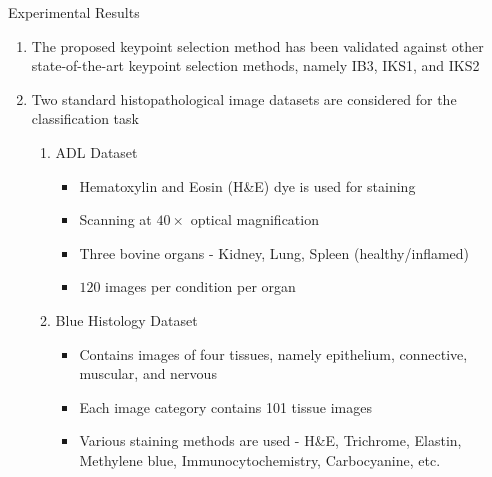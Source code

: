 \documentclass [9pt,times] {beamer}
\begin{document}
\begin{frame}{Experimental Results}
\fontsize{7pt}{9pt}\selectfont
\begin{enumerate}
			\justifying
			\item The proposed keypoint selection method has been validated against 						other state-of-the-art keypoint selection methods, namely IB3, IKS1, and 						IKS2 \cite{lin2016} \\[0.2cm]
			
			\item Two standard \textcolor[rgb]{1.00,0.00,0.00}{histopathological image datasets} are considered for the classification task
			\begin{enumerate}
\fontsize{7pt}{9pt}\selectfont
			\item  \textcolor[rgb]{0.00,0.00,1.00}{ADL Dataset} \cite{srinivas2014}
			\begin{itemize}
\fontsize{7pt}{9pt}\selectfont
				\item Hematoxylin and Eosin (H\&E) dye is used for staining
				\item Scanning at $40\times$ optical magnification   
				\item  Three bovine organs - Kidney, Lung, Spleen   (healthy/inflamed)
				\item $120$ images per condition per organ
			\end{itemize}
			\item \textcolor[rgb]{0.00,0.00,1.00}{Blue Histology Dataset} \cite{sirinukunwattana2016locality}
 			\begin{itemize}
\fontsize{7pt}{9pt}\selectfont
				\item Contains images of four tissues, namely epithelium, connective, muscular, and nervous
				\item Each image category contains 101 tissue images
				
				\item Various staining methods are used - H\&E, Trichrome, Elastin, Methylene blue, Immunocytochemistry, Carbocyanine, etc.
				
				

			\end{itemize}
			\end{enumerate}
			

\end{enumerate}
\end{frame}
\end{document}
